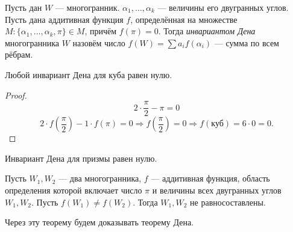 \begin{definition}
    Пусть дан $W$ — многогранник. $\alpha_1, \dots, \alpha_k$ — величины его двугранных углов. Пусть дана аддитивная функция $f$, определённая на множестве $M: \{\alpha_1, \dots, \alpha_k, \pi\} \in M$, причём $f(\pi) = 0$. Тогда \textit{инвариантом Дена} многогранника $W$ назовём число $f(W) = \sum a_i f(\alpha_i)$ — сумма по всем рёбрам.
\end{definition}

\begin{statement}
    Любой инвариант Дена для куба равен нулю.
\end{statement}
\begin{proof}
    $$2 \cdot \frac{\pi}{2} - \pi = 0$$
    $$2 \cdot f \left(\frac{\pi}2\right) - 1 \cdot f(\pi) = 0 \Rightarrow f \left(\frac{\pi}2\right) = 0 \Rightarrow f(\text{куб}) = 6 \cdot 0 = 0.$$
\end{proof}

\begin{statement}
    Инвариант Дена для призмы равен нулю.
\end{statement}

\begin{theorem}[Хадвигер]
    Пусть $W_1, W_2$ — два многогранника, $f$ — аддитивная функция, область определения которой включает число $\pi$ и величины всех двугранных углов $W_1, W_2$. Пусть $f(W_1) \neq f(W_2)$. Тогда $W_1, W_2$ не равносоставлены.
\end{theorem}

\begin{remark}
    Через эту теорему будем доказывать теорему Дена.
\end{remark}


